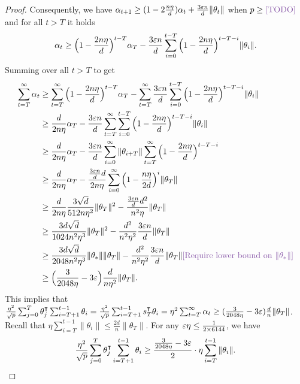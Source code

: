 \begin{proof}
    Consequently, we have $\alpha_{t+1} \geq (1-2\frac{n\eta}{d})\alpha_t + \frac{3\varepsilon n}{d}\|\theta_t\|$ when $p\geq \icomment{TODO}$ and for all $t>T$ it holds
    \begin{align*}
        \alpha_t \geq \Big( 1-\frac{2n\eta}{d} \Big)^{t-T}\alpha_T - \frac{3\varepsilon n}{d} \sum_{i=0}^{t-T} \Big( 1-\frac{2n\eta}{d} \Big)^{t-T-i} \|\theta_i\|.
    \end{align*}
    Summing over all $t>T$ to get
    \begin{align*}
        \sum_{t=T}^\infty\alpha_t & \geq \sum_{t=T}^\infty \Big( 1-\frac{2n\eta}{d} \Big)^{t-T}\alpha_T - \sum_{t=T}^\infty \frac{3\eps n}{d} \sum_{i=0}^{t-T} \Big( 1-\frac{2n\eta}{d} \Big)^{t-T-i}\|\theta_i\| \\
        & \geq \frac{d}{2n\eta}\alpha_T - \frac{3\eps n}{d} \sum_{t=T}^\infty\sum_{i=0}^{t-T} \Big( 1-\frac{2n\eta}{d} \Big)^{t-T-i}\|\theta_i\| \\
        &\geq \frac{d}{2n\eta}\alpha_T - \frac{3\eps n}{d} \sum_{i=0}^\infty\|\theta_{i+T}\|\sum_{t=T}^\infty \Big( 1-\frac{2n\eta}{d} \Big)^{t-T-i} \\
        &\geq \frac{d}{2n\eta}\alpha_T - \frac{\frac{3\eps n}{d} d}{2n\eta} \sum_{i=0}^\infty \Big( 1-\frac{n\eta}{2d} \Big)^i \|\theta_{T}\| \\
        &\geq \frac{d}{2n\eta} \frac{3\sqrt{d}}{512n\eta^2} \|\theta_T\|^2 - \frac{\frac{3\eps n}{d} d^2}{n^2\eta} \|\theta_T\| \\
        &\geq \frac{3d\sqrt{d}}{1024n^2\eta^3} \|\theta_T\|^2 - \frac{d^2}{n^2\eta^2} \frac{3\eps n}{d} \|\theta_T\| \\
        &\geq \frac{3d\sqrt{d}}{2048n^2\eta^3} \|\theta_*\| \|\theta_T\| - \frac{d^2}{n^2\eta^2} \frac{3\eps n}{d} \|\theta_T\| \icomment{Require lower bound on $\|\theta_*\|$} \\
        & \geq \Big( \frac{3}{2048\eta} - 3\eps \Big) \frac{d}{n\eta^2} \|\theta_T\|.
    \end{align*}
    This implies that $\frac{\eta^2}{\sqrt p}\sum_{j=0}^T \theta_j\transpose \sum_{i=T+1}^{t-1} \theta_i = \frac{\eta^2}{\sqrt p} \sum_{i=T+1}^{t-1} s_T\transpose \theta_i = \eta^2 \sum_{t=T}^\infty\alpha_t \geq ( \frac{3}{2048\eta} - 3\eps ) \frac{d}{n} \|\theta_T\|$. Recall that $\eta\sum_{i=T}^{t-1} \|\theta_i\| \leq \frac{2d}{n} \|\theta_T\|$. For any $\varepsilon\eta \leq \frac{1}{2\times 6144}$, we have
    \begin{align*}
        \frac{\eta^2}{\sqrt p}\sum_{j=0}^T \theta_j\transpose \sum_{i=T+1}^{t-1} \theta_i \geq \frac{\frac{3}{2048\eta} - 3\eps}{2} \cdot \eta\sum_{i=T}^{t-1} \|\theta_i\|.
    \end{align*}
    

\end{proof}
